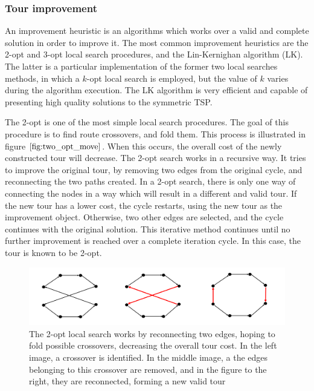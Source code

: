 \subsubsection{Tour improvement}

An improvement heuristic is an algorithms which works over a valid and complete solution in order to improve it. The most common improvement heuristics are the 2-opt and 3-opt local search procedures, and the Lin-Kernighan algorithm (LK). The latter is a particular implementation of the former two local searches methods, in which a $k$-opt local search is employed, but the value of $k$ varies during the algorithm execution. The LK algorithm is very efficient and capable of presenting high quality solutions to the symmetric TSP.

The 2-opt is one of the most simple local search procedures. The goal of this procedure is to find route crossovers, and fold them. This process is illustrated in figure $\ref{fig:two_opt_move}$. When this occurs, the overall cost of the newly constructed tour will decrease. The 2-opt search works in a recursive way. It tries to improve the original tour, by removing two edges from the original cycle, and reconnecting the two paths created. In a 2-opt search, there is only one way of connecting the nodes in a way which will result in a different and valid tour. If the new tour has a lower cost, the cycle restarts, using the new tour as the improvement object. Otherwise, two other edges are selected, and the cycle continues with the original solution. This iterative method continues until no further improvement is reached over a complete iteration cycle. In this case, the tour is known to be 2-opt.

\begin{figure}[htpb]
  \centering
  \includegraphics[width=.7\textwidth]{./Figures/tsp/2-opt-explained}
  \caption{The 2-opt local search works by reconnecting two edges, hoping to
  fold possible crossovers, decreasing the overall tour cost. In the left image,
  a crossover is identified. In the middle image, a the edges belonging to this crossover
  are removed, and in the figure to the right, they are reconnected, forming a new valid tour}
  \label{fig:two_opt_move}
\end{figure}

